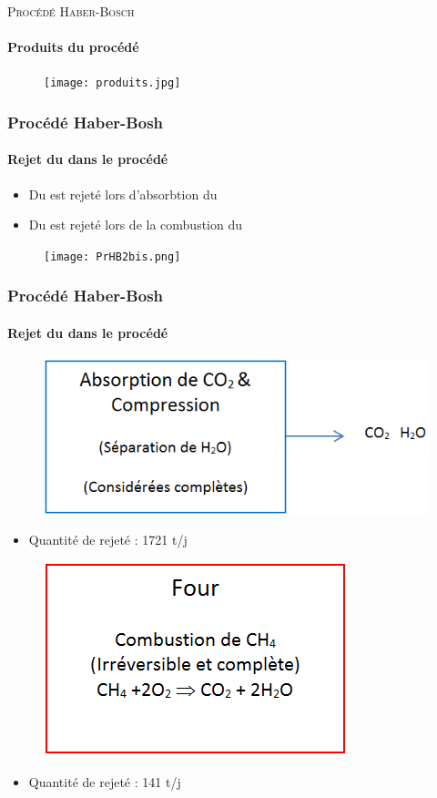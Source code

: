 \documentclass{beamer}
\begin{document}
\begin{frame}{\textsc{Procédé Haber-Bosch}}
\framesubtitle{Produits du procédé}
\begin{figure}
\centering
\texttt{[image: produits.jpg]}
\end{figure}
\end{frame}

\begin{frame}
\frametitle{Procédé Haber-Bosh}
\framesubtitle{Rejet du  dans le procédé}
\begin{itemize}
\item Du  est rejeté lors d'absorbtion du 
\item Du  est rejeté lors de la combustion du 
\end{itemize}
\begin{figure}[ht!]
\centering
\texttt{[image: PrHB2bis.png]}
\label{scheme}
\end{figure}
\end{frame}

\begin{frame}
\frametitle{Procédé Haber-Bosh}
\framesubtitle{Rejet du  dans le procédé}
\begin{figure} [ht!]
\centering
\includegraphics[scale=0.42] {Bloc_compression.png}
\end {figure}
\begin{itemize}
\item {Quantité de  rejeté : 1721 t/j }
\end{itemize}
\begin{figure} [ht!]
\centering
\includegraphics[scale=0.4] {Bloc_four.png}
\end{figure}
\begin{itemize}
\item {Quantité de  rejeté : 141 t/j}
\end{itemize}
\end{frame}
\end{document}
